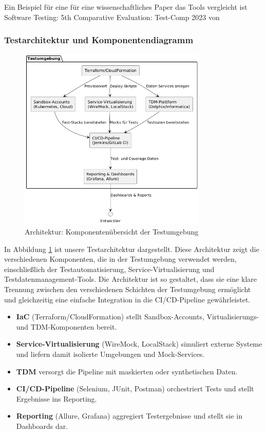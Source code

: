 Ein Beispiel für eine für eine wissenschaftliches Paper das Tools vergleicht ist Software Testing:
5th Comparative Evaluation: {Test-Comp 2023} von \cite{beyer2023}

\subsubsection{Testarchitektur und Komponentendiagramm}

\begin{figure}[h!]
    \centering
    \includegraphics[width=0.8\textwidth]{fig/test_architecture_enviroment.png}
    \caption{Architektur: Komponentenübersicht der Testumgebung}
    \label{fig:architecture}
\end{figure} 

In Abbildung \ref{fig:architecture} ist unsere Testarchitektur dargestellt.
Diese Architektur zeigt die verschiedenen Komponenten, die in der Testumgebung verwendet werden,
einschließlich der Testautomatisierung, Service-Virtualisierung und Testdatenmanagement-Tools.
Die Architektur ist so gestaltet, dass sie eine klare Trennung zwischen den verschiedenen Schichten
der Testumgebung ermöglicht und gleichzeitig eine einfache Integration in die CI/CD-Pipeline
gewährleistet.

\begin{itemize}
    \item \textbf{IaC}  (Terraform/CloudFormation) stellt Sandbox-Accounts, Virtualisierungs-
    und TDM-Komponenten bereit.
    \item \textbf{Service-Virtualisierung} (WireMock, LocalStack) simuliert externe Systeme und
    liefern damit isolierte Umgebungen und Mock-Services.
    \item \textbf{TDM} versorgt die Pipeline mit maskierten oder synthetischen Daten.
    \item \textbf{CI/CD-Pipeline} (Selenium, JUnit, Postman) orchestriert Tests und stellt
    Ergebnisse ins Reporting.
    \item \textbf{Reporting} (Allure, Grafana) aggregiert Testergebnisse und stellt sie in
    Dashboards dar.
\end{itemize}

